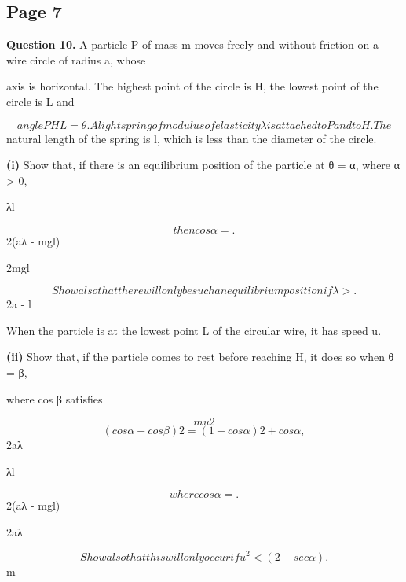 \documentclass[12pt]{article}
\begin{document}
\subsection*{Page 7}
\begin{flushleft}
\bigskip\textbf{Question 10.} A particle P of mass m moves freely and without friction on a wire circle of radius a, whose\par
axis is horizontal. The highest point of the circle is H, the lowest point of the circle is L and\par
\[angle P HL = θ. A light spring of modulus of elasticity λ is attached to P and to H. The\]
natural length of the spring is l, which is less than the diameter of the circle.\par
\textbf{(i)} Show that, if there is an equilibrium position of the particle at θ = α, where α > 0,\par
λl\par
\[then cos α = .\]
2(aλ - mgl)\par
2mgl\par
\[Show also that there will only be such an equilibrium position if λ > .\]
2a - l\par
When the particle is at the lowest point L of the circular wire, it has speed u.\par
\textbf{(ii)} Show that, if the particle comes to rest before reaching H, it does so when θ = β,\par
where cos β satisfies\par
\[mu2\]
\[(cos α - cos β)2 = (1 - cos α)2 + cos α,\]
2aλ\par
λl\par
\[where cos α = .\]
2(aλ - mgl)\par
2aλ\par
\[Show also that this will only occur if u^2 < (2 - sec α).\]
m\par
\end{flushleft}
\end{document}
